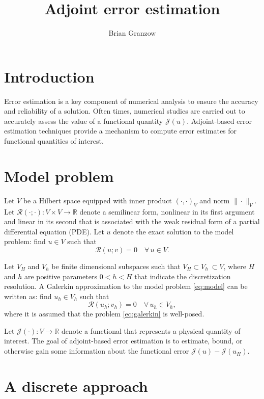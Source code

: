 \documentclass{article}
\title{Adjoint error estimation}
\author{Brian Granzow}
\newcommand{\R}{\mathcal{R}}
\newcommand{\J}{\mathcal{J}}
\begin{document}
\maketitle

\section{Introduction}
Error estimation is a key component of numerical
analysis to ensure the accuracy and reliability
of a solution. Often times, numerical studies
are carried out to accurately assess the value
of a functional quantity $\J(u)$. Adjoint-based
error estimation techniques provide a mechanism
to compute error estimates for functional
quantities of interest.

\section{Model problem}
Let $V$ be a Hilbert space equipped with inner
product $(\cdot, \cdot)_V$ and norm $\| \cdot \|_V$.
Let $\R(\cdot; \cdot): V \times V \to \mathbb{R}$ denote
a semilinear form, nonlinear in its first argument
and linear in its second that is associated with
the weak residual form of a partial differential
equation (PDE). Let $u$ denote the exact solution
to the model problem: find $u \in V$ such that
%
\begin{equation}
\R(u;v) = 0 \quad \forall \, u \in V.
\label{eq:model}
\end{equation}

Let $V_H$ and $V_h$ be finite dimensional subspaces
such that $V_H \subset V_h \ \subset V$, where $H$ and
$h$ are positive parameters $0 < h < H$ that indicate
the discretization resolution. A Galerkin
approximation to the model problem \eqref{eq:model}
can be written as: find $u_h \in V_h$ such that
%
\begin{equation}
\R(u_h; v_h) = 0 \quad \forall \, u_h \in V_h,
\label{eq:galerkin}
\end{equation}
where it is assumed that the problem
\eqref{eq:galerkin} is well-posed.

Let $\J(\cdot) : V \to \mathbb{R}$ denote a functional
that represents a physical quantity of interest.
The goal of adjoint-based error estimation is to
estimate, bound, or otherwise gain some information
about the functional error $\J(u) - \J(u_H)$.

\section{A discrete approach}
\end{document}
